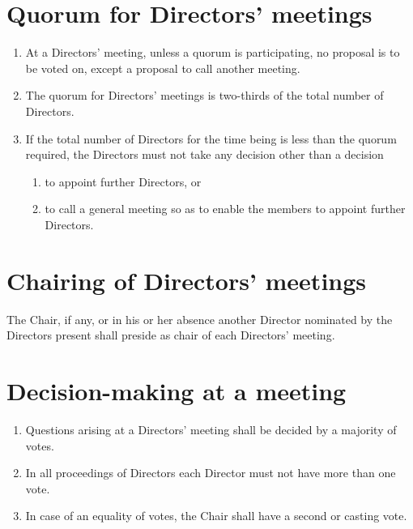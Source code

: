 \documentclass[a4paper,12pt]{article}
\begin{document}
\section{Quorum for Directors’ meetings}

\begin{enumerate}
  \item At a Directors’ meeting, unless a quorum is participating, no proposal is to be voted on, except a proposal to call another meeting.
  \item The quorum for Directors’ meetings is two-thirds of the total number of Directors. %
  \item If the total number of Directors for the time being is less than the quorum required, the Directors must not take any decision other than a decision
  \begin{enumerate}
    \item to appoint further Directors, or
    \item to call a general meeting so as to enable the members to appoint further Directors.
  \end{enumerate}
\end{enumerate}

\section{Chairing of Directors' meetings}

The Chair, if any, or in his or her absence another Director nominated by the Directors present shall preside as chair of each Directors’ meeting.

\section{Decision-making at a meeting}

\begin{enumerate}
  \item Questions arising at a Directors’ meeting shall be decided by a majority of votes. %
  \item In all proceedings of Directors each Director must not have more than one vote. %
  \item In case of an equality of votes, the Chair shall have a second or casting vote.
\end{enumerate}
\end{document}
